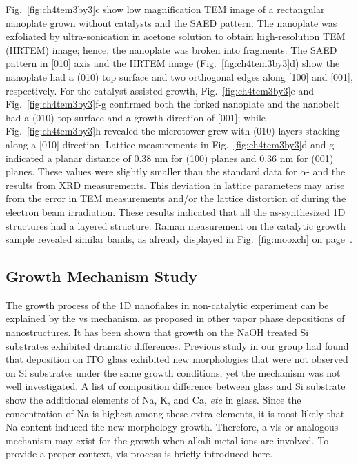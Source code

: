 Fig.~\ref{fig:ch4tem3by3}c show low magnification TEM image of a rectangular nanoplate grown without catalysts and the SAED pattern. The nanoplate was exfoliated by ultra-sonication in acetone solution to obtain high-resolution TEM (HRTEM) image; hence, the nanoplate was broken into fragments. The SAED pattern in [010] axis and the HRTEM image (Fig.~\ref{fig:ch4tem3by3}d) show the nanoplate had a (010) top surface and two orthogonal edges along [100] and [001], respectively. For the catalyst-assisted growth, Fig.~\ref{fig:ch4tem3by3}e and Fig.~\ref{fig:ch4tem3by3}f-g confirmed both the forked nanoplate and the nanobelt had a (010) top surface and a growth direction of [001]; while Fig.~\ref{fig:ch4tem3by3}h revealed the microtower grew with (010) layers stacking along a [010] direction. Lattice measurements in Fig.~\ref{fig:ch4tem3by3}d and g indicated a planar distance of 0.38 nm for (100) planes and 0.36 nm for (001) planes. These values were slightly smaller than the standard data for $\alpha$- and the results from XRD measurements. This deviation in lattice parameters may arise from the error in TEM measurements and/or the lattice distortion of  during the electron beam irradiation.\cite{Wang2004b} These results indicated that all the as-synthesized 1D structures had a layered structure. Raman measurement on the catalytic growth sample revealed similar  bands, as already displayed in Fig.~\ref{fig:mooxch} on page~\pageref{fig:mooxch}. 

\subsection{Growth Mechanism Study}\label{sec:nasi}

The growth process of the 1D  nanoflakes in non-catalytic experiment can be explained by the \gls{vs} mechanism, as proposed in other vapor phase depositions of  nanostructures.\cite{Brezesinski2010, Kalantar-zadeh2010} It has been shown that  growth on the NaOH treated Si substrates exhibited dramatic differences. Previous study in our group had found that  deposition on ITO glass exhibited new morphologies that were not observed on Si substrates under the same growth conditions, yet the mechanism was not well investigated.\cite{predeep2011} A list of composition difference between glass and Si substrate show the additional elements of Na, K, and Ca, \emph{etc} in glass. Since the concentration of Na is highest among these extra elements, it is most likely that Na content induced the new morphology growth. Therefore, a \gls{vls} or analogous mechanism may exist for the  growth when alkali metal ions are involved. To provide a proper context, \gls{vls} process is briefly introduced here. 

